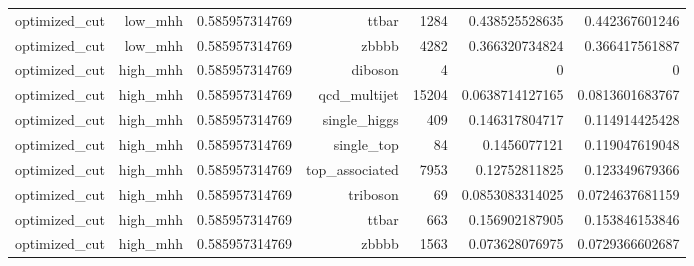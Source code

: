 \begin{table}[htbp]
{\begin{tabular}{lrrrrrr}
optimized\_cut & low\_mhh & 0.585957314769 & ttbar & 1284 & 0.438525528635 & 0.442367601246 \\
optimized\_cut & low\_mhh & 0.585957314769 & zbbbb & 4282 & 0.366320734824 & 0.366417561887 \\
optimized\_cut & high\_mhh & 0.585957314769 & diboson & 4 & 0 & 0 \\
optimized\_cut & high\_mhh & 0.585957314769 & qcd\_multijet & 15204 & 0.0638714127165 & 0.0813601683767 \\
optimized\_cut & high\_mhh & 0.585957314769 & single\_higgs & 409 & 0.146317804717 & 0.114914425428 \\
optimized\_cut & high\_mhh & 0.585957314769 & single\_top & 84 & 0.1456077121 & 0.119047619048 \\
optimized\_cut & high\_mhh & 0.585957314769 & top\_associated & 7953 & 0.12752811825 & 0.123349679366 \\
optimized\_cut & high\_mhh & 0.585957314769 & triboson & 69 & 0.0853083314025 & 0.0724637681159 \\
optimized\_cut & high\_mhh & 0.585957314769 & ttbar & 663 & 0.156902187905 & 0.153846153846 \\
optimized\_cut & high\_mhh & 0.585957314769 & zbbbb & 1563 & 0.073628076975 & 0.0729366602687 \\
\bottomrule
\end{tabular}
}
\end{table}
